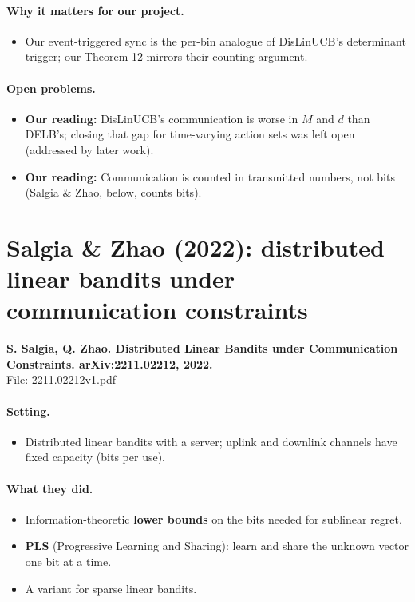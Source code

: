 \documentclass[11pt]{article}
\newcommand{\ours}{\textcolor{orange!80!black}{\textbf{Our reading:}}}
\newcommand{\file}[1]{\url{#1}}
\begin{document}
\paragraph{Why it matters for our project.}
\begin{itemize}\item Our event-triggered sync is the per-bin analogue of DisLinUCB's determinant trigger; our Theorem 12 mirrors their counting argument.\end{itemize}
\paragraph{Open problems.}
\begin{itemize}\item \ours{} DisLinUCB's communication is worse in $M$ and $d$ than DELB's; closing that gap for time-varying action sets was left open (addressed by later work).\item \ours{} Communication is counted in transmitted numbers, not bits (Salgia \& Zhao, below, counts bits).\end{itemize}
\section{Salgia \& Zhao (2022): distributed linear bandits under communication constraints}
\textbf{S. Salgia, Q. Zhao. Distributed Linear Bandits under Communication Constraints. arXiv:2211.02212, 2022.}\\ File: \file{2211.02212v1.pdf}
\paragraph{Setting.}
\begin{itemize}\item Distributed linear bandits with a server; uplink and downlink channels have fixed capacity (bits per use).\end{itemize}
\paragraph{What they did.}
\begin{itemize}\item Information-theoretic \textbf{lower bounds} on the bits needed for sublinear regret.\item \textbf{PLS} (Progressive Learning and Sharing): learn and share the unknown vector one bit at a time.\item A variant for sparse linear bandits.\end{itemize}
\end{document}

